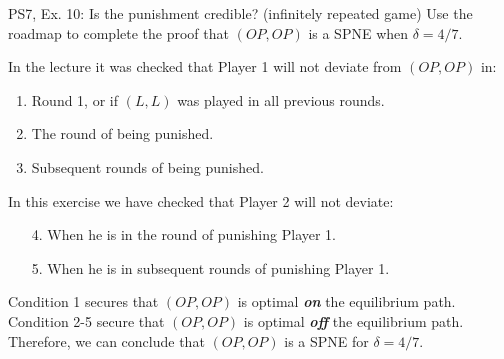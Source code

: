 \begin{frame}{PS7, Ex. 10: Is the punishment credible? (infinitely repeated game)}
  Use the roadmap to complete the proof that $(OP,OP)$ is a SPNE when $\delta=4/7$.\vspace{-4pt}
  \begin{multicols}{2}
    In the lecture it was checked that Player 1 will not deviate from $(OP,OP)$ in:
    \begin{enumerate}
      \item Round 1, or if $(L,L)$ was played in all previous rounds.
      \item The  round of being punished.
      \item Subsequent rounds of being punished.
    \end{enumerate}
    In this exercise we have checked that Player 2 will not deviate:
    \begin{itemize}
      \item[4.] When he is in the  round of punishing Player 1.
      \item[5.] When he is in subsequent rounds of punishing Player 1.
    \end{itemize}
    \vfill\null\columnbreak
    Condition 1 secures that $(OP,OP)$ is optimal \textbf{\textit{on}} the equilibrium path.\\\medskip
    Condition 2-5 secure that $(OP,OP)$ is optimal \textbf{\textit{off}} the equilibrium path.\\\medskip
    Therefore, we can conclude that $(OP,OP)$ is a SPNE for $\delta = 4/7$.
    \vfill\null
  \end{multicols}
  \vfill\null
\end{frame}
